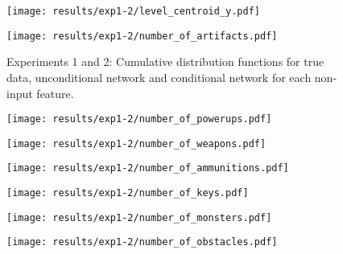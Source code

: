 \begin{figure}[ht]
	
	\begin{minipage}[b]{0.45\linewidth}
		\centering
		\texttt{[image: results/exp1-2/level\_centroid\_y.pdf]} 
		\label{fig:results-noninput-level_centroid_y}
	\end{minipage}
	\begin{minipage}[b]{0.45\linewidth}
		\centering
		\texttt{[image: results/exp1-2/number\_of\_artifacts.pdf]} 
		\label{fig:results-noninput-number_of_artifacts}
	\end{minipage} 
	
	
	\caption[Graphical results for experiments 1 and 2]{Experiments 1 and 2: Cumulative distribution functions for true data, unconditional network and conditional network for each non-input feature.}
\end{figure}\begin{figure}[ht]
	\begin{minipage}[b]{0.45\linewidth}
		\centering
		\texttt{[image: results/exp1-2/number\_of\_powerups.pdf]} 
		\label{fig:results-noninput-number_of_powerups}
	\end{minipage}
	\begin{minipage}[b]{0.45\linewidth}
		\centering
		\texttt{[image: results/exp1-2/number\_of\_weapons.pdf]} 
		\label{fig:results-noninput-number_of_weapons}
	\end{minipage} 
	
	
	\begin{minipage}[b]{0.45\linewidth}
		\centering
		\texttt{[image: results/exp1-2/number\_of\_ammunitions.pdf]} 
		\label{fig:results-noninput-number_of_ammunitions}
	\end{minipage}
	\begin{minipage}[b]{0.45\linewidth}
		\centering
		\texttt{[image: results/exp1-2/number\_of\_keys.pdf]} 
		\label{fig:results-noninput-number_of_keys}
	\end{minipage} 
	
	
	\begin{minipage}[b]{0.45\linewidth}
		\centering
		\texttt{[image: results/exp1-2/number\_of\_monsters.pdf]} 
		\label{fig:results-noninput-number_of_monsters}
	\end{minipage}
	\begin{minipage}[b]{0.45\linewidth}
		\centering
		\texttt{[image: results/exp1-2/number\_of\_obstacles.pdf]} 
		\label{fig:results-noninput-number_of_obstacles}
	\end{minipage} 
	

\end{figure}
